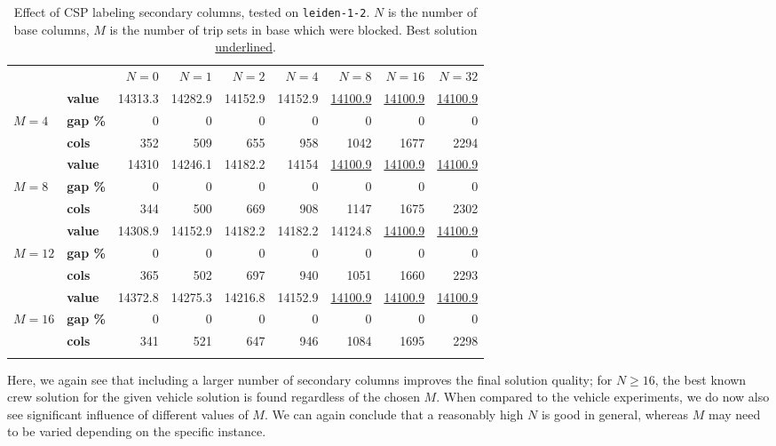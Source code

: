\documentclass[]{article}
\begin{document}
\begin{table}[h]
  \centering
  \begin{tabular}{llrrrrrrr}
    \toprule
    && $N=0$ & $N=1$ & $N=2$ & $N=4$ & $N=8$ & $N=16$ & $N=32$  \\
    \arrayrulecolor{black!30}\cmidrule(lr){1-9}
    \addlinespace[0.4em]
     & \textbf{value}  & 14313.3 & 14282.9 & 14152.9 & 14152.9 & \underline{14100.9} & \underline{14100.9} & \underline{14100.9} \\
    $M=4$ & \textbf{gap \%}   & 0 & 0 & 0 & 0 & 0 & 0 & 0 \\
    & \textbf{cols} & 352 & 509 & 655 & 958 & 1042 & 1677 & 2294 \\
    \arrayrulecolor{black!30}\cmidrule(lr){1-9}
    & \textbf{value}  & 14310 & 14246.1 & 14182.2 & 14154 & \underline{14100.9} & \underline{14100.9} & \underline{14100.9} \\
    $M=8$ & \textbf{gap \%}   & 0 & 0 & 0 & 0 & 0 & 0 & 0 \\
    & \textbf{cols} & 344 & 500 & 669 & 908 & 1147 & 1675 & 2302 \\
    \arrayrulecolor{black!30}\cmidrule(lr){1-9}
    & \textbf{value}  & 14308.9 & 14152.9 & 14182.2 & 14182.2 & 14124.8 & \underline{14100.9} & \underline{14100.9} \\
    $M=12$ & \textbf{gap \%}   & 0 & 0 & 0 & 0 & 0 & 0 & 0 \\
    & \textbf{cols} & 365 & 502 & 697 & 940 & 1051 & 1660 & 2293 \\
    \arrayrulecolor{black!30}\cmidrule(lr){1-9}
    & \textbf{value}  & 14372.8 & 14275.3 & 14216.8 & 14152.9 & \underline{14100.9} & \underline{14100.9} & \underline{14100.9} \\
    $M=16$ & \textbf{gap \%}   & 0 & 0 & 0 & 0 & 0 & 0 & 0 \\
    & \textbf{cols} & 341 & 521 & 647 & 946 & 1084 & 1695 & 2298 \\
    \arrayrulecolor{black}\bottomrule
  \end{tabular}
  \caption{Effect of CSP labeling secondary columns, tested on \texttt{leiden-1-2}. $N$ is the number of base columns, $M$ is the number of trip sets in base which were blocked. Best solution \underline{underlined}.}
  \label{tab:csp-secondary-columns}
\end{table}

Here, we again see that including a larger number of secondary columns improves the final solution quality; for $N \geq 16$, the best known crew solution for the given vehicle solution is found regardless of the chosen $M$. When compared to the vehicle experiments, we do now also see significant influence of different values of $M$. We can again conclude that a reasonably high $N$ is good in general, whereas $M$ may need to be varied depending on the specific instance.
\end{document}
